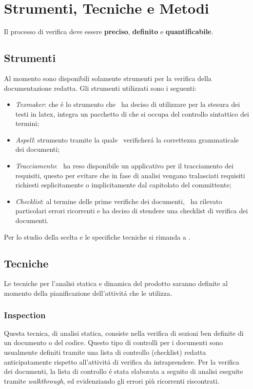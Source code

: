 \section{Strumenti, Tecniche e Metodi}
Il processo di verifica deve essere \textbf{preciso}, \textbf{definito} e \textbf{quantificabile}.
\subsection{Strumenti}
Al momento sono disponibili solamente strumenti per la verifica della documentazione redatta. Gli strumenti utilizzati sono i seguenti:
\begin{itemize}
\item \textit{Texmaker}: che \'e lo strumento che \gruppo ~ha deciso di utilizzare per la stesura dei testi in latex, integra un pacchetto di che si occupa del controllo sintattico dei termini;
\item \textit{Aspell}: strumento tramite la quale \gruppo ~verificher\'a la correttezza grammaticale dei documenti;
\item \textit{Tracciamento}: \gruppo ~ha reso disponibile un applicativo per il tracciamento dei requisiti, questo per evitare che in fase di analisi vengano tralasciati requisiti richiesti esplicitamente o implicitamente dal capitolato del committente;
\item \textit{Checklist}: al termine delle prime verifiche dei documenti, \gruppo ~ha rilevato particolari errori ricorrenti e ha deciso di stendere una checklist di verifica dei documenti.
\end{itemize}
Per lo studio della scelta e le specifiche tecniche si rimanda a \infoNDP. 
\subsection{Tecniche}
Le tecniche per l'analisi statica e dinamica del prodotto saranno definite al momento della pianificazione dell'attivit\'a che le utilizza.
\subsubsection{Inspection}
Questa tecnica, di analisi statica, consiste nella verifica di sezioni ben definite di un documento o del codice. Questo tipo di controlli per i documenti sono usualmente definiti tramite una lista di controllo (checklist) redatta anticipatamente rispetto all'attivit\'a di verifica da intraprendere. Per la verifica dei documenti, la lista di controllo \'e stata elaborata a seguito di analisi eseguite tramite \textit{walkthrough}, ed evidenziando gli errori più ricorrenti riscontrati.

